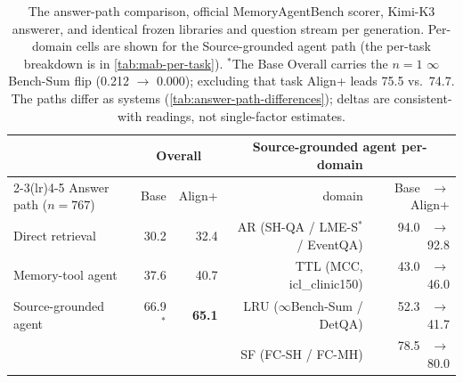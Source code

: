 \begin{table}[t]
\centering
\footnotesize
\begin{tabular}{@{}lrrrr@{}}
\toprule
 & \multicolumn{2}{c}{Overall} & \multicolumn{2}{c}{Source-grounded agent per-domain} \\
\cmidrule(lr){2-3}\cmidrule(lr){4-5}
Answer path ($n{=}767$) & Base & Align+ & domain & Base \ $\to$ \ Align+ \\
\midrule
Direct retrieval & 30.2 & 32.4 & AR (SH-QA / LME-S$^{*}$ / EventQA) & 94.0 \ $\to$ \ 92.8 \\
Memory-tool agent & 37.6 & 40.7 & TTL (MCC, icl\_clinic150) & 43.0 \ $\to$ \ 46.0 \\
Source-grounded agent & 66.9$^{*}$ & \textbf{65.1} & LRU ($\infty$Bench-Sum / DetQA) & 52.3 \ $\to$ \ 41.7 \\
 & & & SF (FC-SH / FC-MH) & 78.5 \ $\to$ \ 80.0 \\
\bottomrule
\end{tabular}
\caption{The answer-path comparison, official MemoryAgentBench scorer, Kimi-K3 answerer, and identical frozen libraries and question stream per generation. Per-domain cells are shown for the Source-grounded agent path (the per-task breakdown is in \cref{tab:mab-per-task}). $^{*}$The Base Overall carries the $n{=}1$ $\infty$Bench-Sum flip (0.212 $\to$ 0.000); excluding that task Align+ leads 75.5 vs.\ 74.7. The paths differ as systems (\cref{tab:answer-path-differences}); deltas are consistent-with readings, not single-factor estimates.}
\label{tab:track-ladder}
\end{table}
